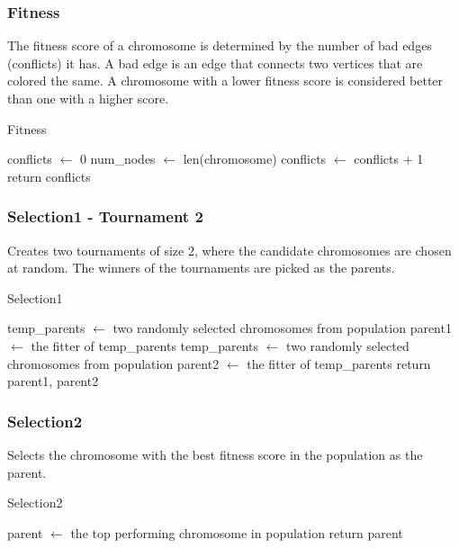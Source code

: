 \documentclass[10pt]{article}
\begin{document}
\subsubsection{Fitness}
The fitness score of a chromosome is determined by the number of bad edges (conflicts) it has. A bad edge is an edge that connects two vertices that are colored the same. A chromosome with a lower fitness score is considered better than one with a higher score.

\begin{algorithm}[H]
\caption{Fitness}
\begin{algorithmic}[1]
\State conflicts $\gets$ 0
\State num\_nodes $\gets$ len(chromosome)
\State conflicts $\gets$ conflicts + 1
\EndIf
\EndFor
\EndFor
\State return conflicts
\EndProcedure
\end{algorithmic}
\end{algorithm}
\subsubsection{Selection1 - Tournament 2} Creates two tournaments of size 2, where the candidate chromosomes are chosen at random. The winners of the tournaments are picked as the parents.

\begin{algorithm}[H]
\caption{Selection1}
\begin{algorithmic}[1]
    \State temp\_parents $\gets$ two randomly selected chromosomes from population
    \State parent1 $\gets$ the fitter of temp\_parents
    \State temp\_parents $\gets$ two randomly selected chromosomes from population
    \State parent2 $\gets$ the fitter of temp\_parents
    \State return parent1, parent2
\EndProcedure
\end{algorithmic}
\end{algorithm}

\subsubsection{Selection2} Selects the chromosome with the best fitness score in the population as the parent.
\begin{algorithm}[H]
\caption{Selection2}
\begin{algorithmic}[1]
\State parent $\gets$ the top performing chromosome in population
\State return parent
\EndProcedure
\end{algorithmic}
\end{algorithm}
\end{document}
